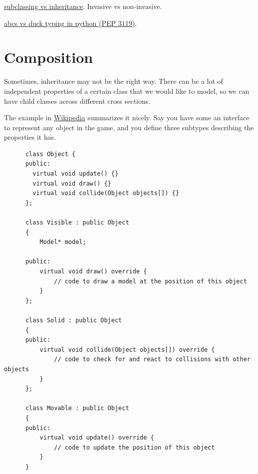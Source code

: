   \href{https://stackoverflow.com/questions/3392352/python-abcs-registering-vs-subclassing}{subclassing vs inheritance}. Invasive vs non-invasive. 
 
  \href{https://peps.python.org/pep-3119/#abcs-vs-duck-typing}{abcs vs duck typing in python (PEP 3119)}.

\section{Composition} 

  Sometimes, inheritance may not be the right way. There can be a lot of independent properties of a certain class that we would like to model, so we can have child classes across different cross sections. 

  \begin{example}
    The example in \href{https://en.wikipedia.org/wiki/Composition_over_inheritance#Example}{Wikipedia} summarizes it nicely. Say you have some an interface to represent any object in the game, and you define three subtypes describing the properties it has. 

    \begin{lstlisting}
      class Object {
      public:
        virtual void update() {}
        virtual void draw() {}
        virtual void collide(Object objects[]) {}
      };

      class Visible : public Object
      {
          Model* model;

      public:
          virtual void draw() override {
              // code to draw a model at the position of this object
          }
      };

      class Solid : public Object
      {
      public:
          virtual void collide(Object objects[]) override {
              // code to check for and react to collisions with other objects
          }
      };

      class Movable : public Object
      {
      public:
          virtual void update() override {
              // code to update the position of this object
          } 
      } 
    \end{lstlisting} 


\end{example}

